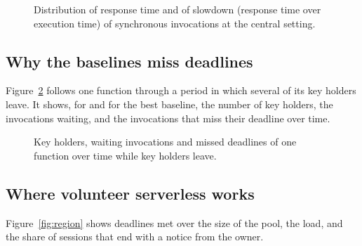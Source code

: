 \begin{figure}[t]
\centering
{}
\caption{Distribution of response time and of slowdown (response time over execution time) of synchronous invocations at the central setting.}
\label{fig:latency}
\end{figure}

\begin{table}[t]
\caption{Key holders and warm memory per system at the central setting.}
\label{tab:holders}
\small
{}
\end{table}

\subsection{Why the baselines miss deadlines}
\label{sec:res-mechanism}

Figure~\ref{fig:episode} follows one function through a period in which several of its key holders leave. It shows,
for \voss{} and for the best baseline, the number of key holders, the invocations waiting, and the invocations that
miss their deadline over time. 

\begin{figure}[t]
\centering
{}
\caption{Key holders, waiting invocations and missed deadlines of one function over time while key holders leave.}
\label{fig:episode}
\end{figure}

\subsection{Where volunteer serverless works}
\label{sec:res-region}

Figure~\ref{fig:region} shows deadlines met over the size of the pool, the load, and the share of sessions that end
with a notice from the owner. 

